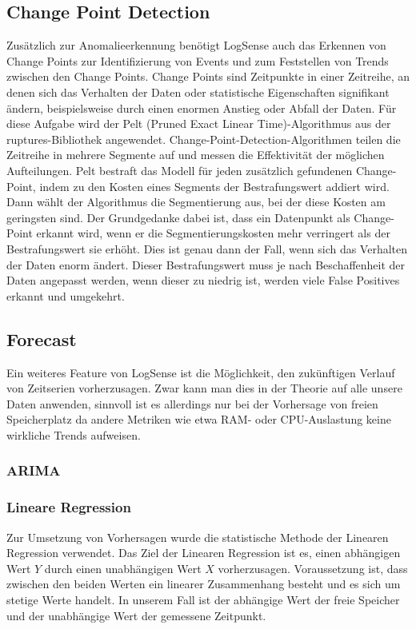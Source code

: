 \documentclass{report}
\begin{document}
\subsection{Change Point Detection}
Zusätzlich zur Anomalieerkennung benötigt LogSense auch das Erkennen von Change Points zur Identifizierung von Events und zum Feststellen von Trends zwischen den Change Points. Change Points sind Zeitpunkte in einer Zeitreihe, an denen sich das Verhalten der Daten oder statistische Eigenschaften signifikant ändern, beispielsweise durch einen enormen Anstieg oder Abfall der Daten. Für diese Aufgabe wird der Pelt (Pruned Exact Linear Time)-Algorithmus aus der ruptures-Bibliothek angewendet. Change-Point-Detection-Algorithmen teilen die Zeitreihe in mehrere Segmente auf und messen die Effektivität der möglichen Aufteilungen. Pelt bestraft das Modell für jeden zusätzlich gefundenen Change-Point, indem zu den Kosten eines Segments der Bestrafungswert addiert wird. Dann wählt der Algorithmus die Segmentierung aus, bei der diese Kosten am geringsten sind. Der Grundgedanke dabei ist, dass ein Datenpunkt als Change-Point erkannt wird, wenn er die Segmentierungskosten mehr verringert als der Bestrafungswert sie erhöht. Dies ist genau dann der Fall, wenn sich das Verhalten der Daten enorm ändert. Dieser Bestrafungswert muss je nach Beschaffenheit der Daten angepasst werden, wenn dieser zu niedrig ist, werden viele False Positives erkannt und umgekehrt.
\subsection{Forecast}
Ein weiteres Feature von LogSense ist die Möglichkeit, den zukünftigen Verlauf von Zeitserien vorherzusagen. Zwar kann man dies in der Theorie auf alle unsere Daten anwenden, sinnvoll ist es allerdings nur bei der Vorhersage von freien Speicherplatz da andere Metriken wie etwa RAM- oder CPU-Auslastung keine wirkliche Trends aufweisen. 
\subsubsection{ARIMA}
\subsubsection{Lineare Regression}

Zur Umsetzung von Vorhersagen wurde die statistische Methode der Linearen Regression verwendet. Das Ziel der Linearen Regression ist es, einen abhängigen Wert \( Y \) durch einen unabhängigen Wert \( X \) vorherzusagen. Voraussetzung ist, dass zwischen den beiden Werten ein linearer Zusammenhang besteht und es sich um stetige Werte handelt. In unserem Fall ist der abhängige Wert der freie Speicher und der unabhängige Wert der gemessene Zeitpunkt.\newline
\end{document}
